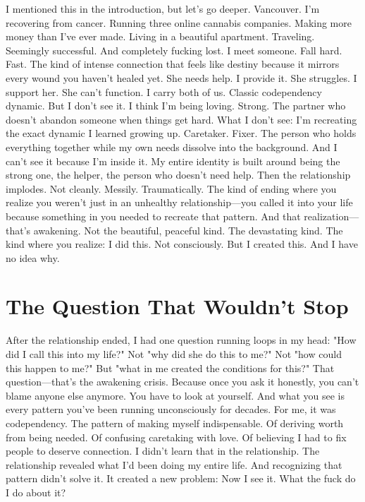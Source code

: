 I mentioned this in the introduction, but let's go deeper.
Vancouver. I'm recovering from cancer. Running three online cannabis companies. Making more money than I've ever made. Living in a beautiful apartment. Traveling. Seemingly successful.
And completely fucking lost.
I meet someone. Fall hard. Fast. The kind of intense connection that feels like destiny because it mirrors every wound you haven't healed yet.
She needs help. I provide it. She struggles. I support her. She can't function. I carry both of us.
Classic codependency dynamic.
But I don't see it. I think I'm being loving. Strong. The partner who doesn't abandon someone when things get hard.
What I don't see: I'm recreating the exact dynamic I learned growing up. Caretaker. Fixer. The person who holds everything together while my own needs dissolve into the background.
And I can't see it because I'm inside it. My entire identity is built around being the strong one, the helper, the person who doesn't need help.
Then the relationship implodes.
Not cleanly. Messily. Traumatically. The kind of ending where you realize you weren't just in an unhealthy relationship—you called it into your life because something in you needed to recreate that pattern.
And that realization—that's awakening.
Not the beautiful, peaceful kind. The devastating kind. The kind where you realize: I did this. Not consciously. But I created this. And I have no idea why.

\section{The Question That Wouldn't Stop}

After the relationship ended, I had one question running loops in my head:
"How did I call this into my life?"
Not "why did she do this to me?" Not "how could this happen to me?" But "what in me created the conditions for this?"
That question—that's the awakening crisis.
Because once you ask it honestly, you can't blame anyone else anymore. You have to look at yourself. And what you see is every pattern you've been running unconsciously for decades.
For me, it was codependency.
The pattern of making myself indispensable. Of deriving worth from being needed. Of confusing caretaking with love. Of believing I had to fix people to deserve connection.
I didn't learn that in the relationship. The relationship revealed what I'd been doing my entire life.
And recognizing that pattern didn't solve it. It created a new problem: Now I see it. What the fuck do I do about it?

